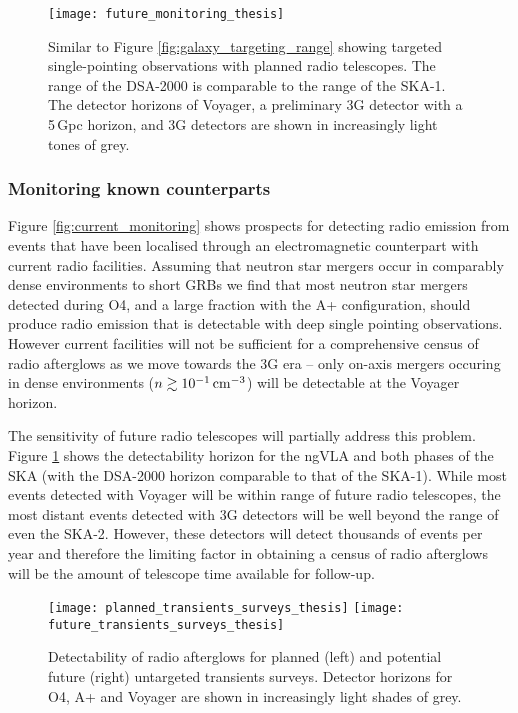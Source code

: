 \begin{figure}
    \centering
    \texttt{[image: future\_monitoring\_thesis]}
    \caption[Monitoring known counterparts with future facilities]{Similar to Figure \ref{fig:galaxy_targeting_range} showing targeted single-pointing observations with planned radio telescopes. The range of the DSA-2000 is comparable to the range of the SKA-1. The detector horizons of Voyager, a preliminary 3G detector with a 5\,Gpc horizon, and 3G detectors are shown in increasingly light tones of grey.}
    \label{fig:future_monitoring}
\end{figure}

\vspace{-5pt}
\subsubsection{Monitoring known counterparts}
\vspace{-5pt}
\label{subsec:monitoring_known_counterparts}
Figure \ref{fig:current_monitoring} shows prospects for detecting radio emission from events that have been localised through an electromagnetic counterpart with current radio facilities. Assuming that neutron star mergers occur in comparably dense environments to short GRBs \citep[$n \sim 10^{-2}\,{\rm cm}^{-3}$][]{2015ApJ...815..102F} we find that most neutron star mergers detected during O4, and a large fraction with the A+ configuration, should produce radio emission that is detectable with deep single pointing observations.
However current facilities will not be sufficient for a comprehensive census of radio afterglows as we move towards the 3G era -- only on-axis mergers occuring in dense environments ($n\gtrsim 10^{-1}\,{\rm cm}^{-3}$) will be detectable at the Voyager horizon.

The sensitivity of future radio telescopes will partially address this problem. Figure \ref{fig:future_monitoring} shows the detectability horizon for the ngVLA and both phases of the SKA (with the DSA-2000 horizon comparable to that of the SKA-1). While most events detected with Voyager will be within range of future radio telescopes, the most distant events detected with 3G detectors will be well beyond the range of even the SKA-2. However, these detectors will detect thousands of events per year and therefore the limiting factor in obtaining a census of radio afterglows will be the amount of telescope time available for follow-up.

\begin{figure*}
    \centering
    \texttt{[image: planned\_transients\_surveys\_thesis]}
    \texttt{[image: future\_transients\_surveys\_thesis]}
    \caption[Serendipitous detection of afterglows in future radio transients surveys]{Detectability of radio afterglows for planned (left) and potential future (right) untargeted transients surveys. Detector horizons for O4, A+ and Voyager are shown in increasingly light shades of grey.}
    \label{fig:transients_surveys_serendipitous}
\end{figure*}

